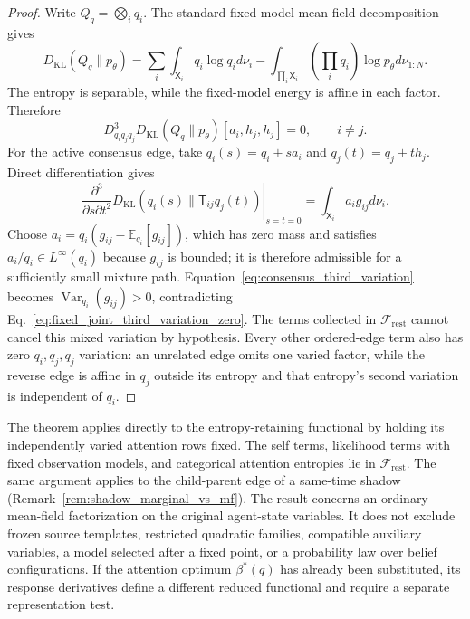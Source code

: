 \begin{proof}
Write $Q_q=\bigotimes_iq_i$. The standard fixed-model mean-field decomposition~\cite{Wainwright2008} gives
\begin{equation}
D_{\mathrm{KL}}(Q_q\|p_\theta)
=\sum_i\int_{\mathsf{X}_i}q_i\log q_i d\nu_i
-\int_{\prod_i\mathsf{X}_i}\left(\prod_iq_i\right)\log p_\theta d\nu_{1:N}.
\label{eq:fixed_joint_mean_field_structure}
\end{equation}
The entropy is separable, while the fixed-model energy is affine in each factor. Therefore
\begin{equation}
D^3_{q_iq_jq_j}D_{\mathrm{KL}}(Q_q\|p_\theta)[a_i,h_j,h_j]=0,
\qquad i\ne j.
\label{eq:fixed_joint_third_variation_zero}
\end{equation}
For the active consensus edge, take $q_i(s)=q_i+s a_i$ and $q_j(t)=q_j+t h_j$. Direct differentiation gives
\begin{equation}
\left.
\frac{\partial^3}{\partial s\partial t^2}
D_{\mathrm{KL}}(q_i(s)\|\mathsf{T}_{ij}q_j(t))
\right|_{s=t=0}
=\int_{\mathsf{X}_i}a_i g_{ij}d\nu_i.
\label{eq:consensus_third_variation}
\end{equation}
Choose $a_i=q_i(g_{ij}-\mathbb{E}_{q_i}[g_{ij}])$, which has zero mass and satisfies $a_i/q_i\in L^\infty(q_i)$ because $g_{ij}$ is bounded; it is therefore admissible for a sufficiently small mixture path. Equation~\eqref{eq:consensus_third_variation} becomes $\operatorname{Var}_{q_i}(g_{ij})>0$, contradicting Eq.~\eqref{eq:fixed_joint_third_variation_zero}. The terms collected in $\mathcal{F}_{\mathrm{rest}}$ cannot cancel this mixed variation by hypothesis. Every other ordered-edge term also has zero $q_i,q_j,q_j$ variation: an unrelated edge omits one varied factor, while the reverse edge is affine in $q_j$ outside its entropy and that entropy's second variation is independent of $q_i$.
\end{proof}

\begin{remark}
\label{rem:state_level_elbo_nogo_scope}
The theorem applies directly to the entropy-retaining functional by holding its independently varied attention rows fixed. The self terms, likelihood terms with fixed observation models, and categorical attention entropies lie in $\mathcal{F}_{\mathrm{rest}}$. The same argument applies to the child-parent edge of a same-time shadow (Remark~\ref{rem:shadow_marginal_vs_mf}). The result concerns an ordinary mean-field factorization on the original agent-state variables. It does not exclude frozen source templates, restricted quadratic families, compatible auxiliary variables, a model selected after a fixed point, or a probability law over belief configurations. If the attention optimum $\beta^*(q)$ has already been substituted, its response derivatives define a different reduced functional and require a separate representation test.
\end{remark}

